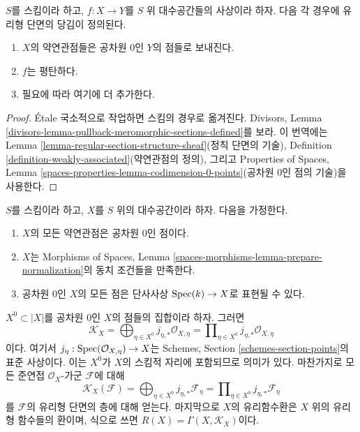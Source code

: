 \begin{lemma}
\label{lemma-pullback-meromorphic-sections-defined}
$S$를 스킴이라 하고, $f : X \to Y$를 $S$ 위 대수공간들의 사상이라 하자.
다음 각 경우에 유리형 단면의 당김이 정의된다.
\begin{enumerate}
\item $X$의 약연관점들은 공차원 $0$인 $Y$의 점들로 보내진다.
\item $f$는 평탄하다.
\item 필요에 따라 여기에 더 추가한다.
\end{enumerate}
\end{lemma}

\begin{proof}
\'Etale 국소적으로 작업하면 스킴의 경우로 옮겨진다. Divisors, Lemma
\ref{divisors-lemma-pullback-meromorphic-sections-defined}를 보라. 이 번역에는
Lemma \ref{lemma-regular-section-structure-sheaf}(정칙 단면의 기술),
Definition \ref{definition-weakly-associated}(약연관점의 정의), 그리고
Properties of Spaces, Lemma
\ref{spaces-properties-lemma-codimension-0-points}(공차원 $0$인 점의 기술)을
사용한다.
\end{proof}

\begin{lemma}
\label{lemma-compute-meromorphic}
$S$를 스킴이라 하고, $X$를 $S$ 위의 대수공간이라 하자. 다음을 가정한다.
\begin{enumerate}
\item[(a)] $X$의 모든 약연관점은 공차원 $0$인 점이다.
\item[(b)] $X$는 Morphisms of Spaces, Lemma
\ref{spaces-morphisms-lemma-prepare-normalization}의 동치 조건들을 만족한다.
\item[(c)] 공차원 $0$인 $X$의 모든 점은 단사사상
$\mathop{\mathrm{Spec}}(k) \to X$로 표현될 수 있다.
\end{enumerate}
$X^0 \subset |X|$를 공차원 $0$인 $X$의 점들의 집합이라 하자. 그러면
$$
\mathcal{K}_X =
\bigoplus\nolimits_{\eta \in X^0} j_{\eta, *}\mathcal{O}_{X, \eta} =
\prod\nolimits_{\eta \in X^0} j_{\eta, *}\mathcal{O}_{X, \eta}
$$
이다. 여기서 $j_\eta : \mathop{\mathrm{Spec}}(\mathcal{O}_{X, \eta}) \to X$는 Schemes,
Section \ref{schemes-section-points}의 표준 사상이다. 이는 $X^0$가 $X$의
스킴적 자리에 포함되므로 의미가 있다. 마찬가지로 모든 준연접
$\mathcal{O}_X$-가군 $\mathcal{F}$에 대해
$$
\mathcal{K}_X(\mathcal{F}) =
\bigoplus\nolimits_{\eta \in X^0} j_{\eta, *}\mathcal{F}_\eta =
\prod\nolimits_{\eta \in X^0} j_{\eta, *}\mathcal{F}_\eta
$$
를 $\mathcal{F}$의 유리형 단면의 층에 대해 얻는다. 마지막으로 $X$의
유리함수환은 $X$ 위의 유리형 함수들의 환이며, 식으로 쓰면
$R(X) = \Gamma(X, \mathcal{K}_X)$이다.
\end{lemma}

